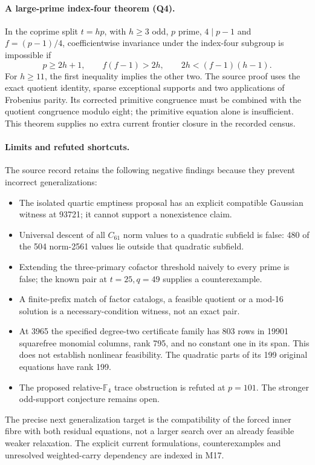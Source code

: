 \documentclass[11pt]{article}
\theoremstyle{definition}
\theoremstyle{remark}
\begin{document}
\paragraph{A large-prime index-four theorem (Q4).}
In the coprime split $t=hp$, with $h\ge3$ odd, $p$ prime,
$4\mid p-1$ and $f=(p-1)/4$, coefficientwise invariance under the
index-four subgroup is impossible if
\[
 p\ge2h+1,\qquad f(f-1)>2h,\qquad
 2h<(f-1)(h-1).
\]
For $h\ge11$, the first inequality implies the other two. The source
proof uses the exact quotient identity, sparse exceptional supports and
two applications of Frobenius parity. Its corrected primitive congruence
must be combined with the quotient congruence modulo eight; the primitive
equation alone is insufficient. This theorem supplies no extra current
frontier closure in the recorded census.

\paragraph{Limits and refuted shortcuts.}
The source record retains the following negative findings because they
prevent incorrect generalizations:
\begin{itemize}
\item The isolated quartic emptiness proposal has an explicit compatible
Gaussian witness at 93721; it cannot support a nonexistence claim.
\item Universal descent of all $C_{61}$ norm values to a quadratic
subfield is false: 480 of the 504 norm-2561 values lie outside that
quadratic subfield.
\item Extending the three-primary cofactor threshold naively to every
prime is false; the known pair at $t=25,q=49$ supplies a counterexample.
\item A finite-prefix match of factor catalogs, a feasible quotient or a
mod-16 solution is a necessary-condition witness, not an exact pair.
\item At 3965 the specified degree-two certificate family has 803 rows
in 19901 squarefree monomial columns, rank 795, and no constant one in
its span. This does not establish nonlinear feasibility. The quadratic
parts of its 199 original equations have rank 199.
\item The proposed relative-$\mathbb F_4$ trace obstruction is refuted
at $p=101$. The stronger odd-support conjecture remains open.
\end{itemize}
The precise next generalization target is the compatibility of the forced
inner fibre with both residual equations, not a larger search over an
already feasible weaker relaxation. The explicit current formulations,
counterexamples and unresolved weighted-carry dependency are indexed in M17.
\end{document}
